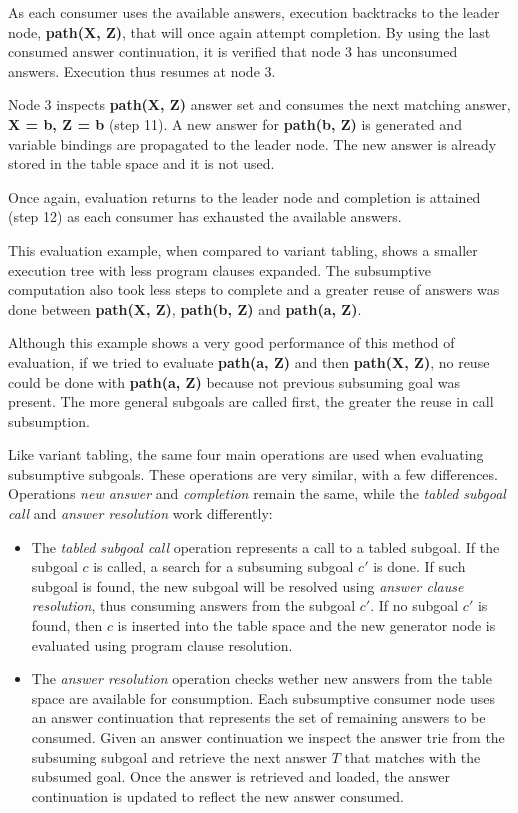 As each consumer uses the available answers, execution backtracks to the leader node, \textbf{path(X, Z)}, that will once
again attempt completion. By using the last consumed answer continuation, it is verified that node 3 has unconsumed answers.
Execution thus resumes at node 3.

Node 3 inspects \textbf{path(X, Z)} answer set and consumes the next matching answer, \textbf{X = b, Z = b} (step 11). A new answer
for \textbf{path(b, Z)} is generated and variable bindings are propagated to the leader node. The new answer is already
stored in the table space and it is not used.

Once again, evaluation returns to the leader node and completion is attained (step 12) as each consumer has exhausted the
available answers.

This evaluation example, when compared to variant tabling, shows a smaller execution tree with less
program clauses expanded. The subsumptive computation also took less steps to complete and a greater
reuse of answers was done between \textbf{path(X, Z)}, \textbf{path(b, Z)} and \textbf{path(a, Z)}.

Although this example shows a very good performance of this method of evaluation, if we tried
to evaluate \textbf{path(a, Z)} and then \textbf{path(X, Z)}, no reuse could be done with \textbf{path(a, Z)}
because not previous subsuming goal was present. The more general subgoals are called first, the greater
the reuse in call subsumption.

Like variant tabling, the same four main operations are used when evaluating subsumptive subgoals.
These operations are very similar, with a few differences. Operations \textit{new answer} and
\textit{completion} remain the same, while the \textit{tabled subgoal call} and \textit{answer resolution}
work differently:

\begin{itemize}
  \item The \textit{tabled subgoal call} operation represents a call to a tabled subgoal.
  If the subgoal $c$ is called, a search for a subsuming subgoal $c'$ is done. If such subgoal is found,
  the new subgoal will be resolved using \textit{answer clause resolution}, thus consuming answers from the subgoal $c'$.
  If no subgoal $c'$ is found, then $c$ is inserted into the table space and the new generator node is evaluated using
  program clause resolution.
  
  \item The \textit{answer resolution} operation checks wether new answers from the table space are available for consumption.
  Each subsumptive consumer node uses an answer continuation that represents
  the set of remaining answers to be consumed. Given an answer continuation we inspect the answer trie from the subsuming subgoal
  and retrieve the next answer $T$ that matches with the subsumed goal. Once the answer is retrieved and loaded, the answer
  continuation is updated to reflect the new answer consumed.
\end{itemize}

